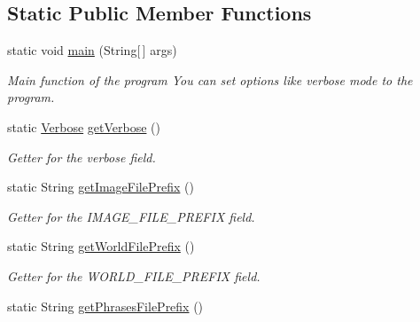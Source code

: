 \subsection*{Static Public Member Functions}
\begin{DoxyCompactItemize}
\item 
static void \hyperlink{a00017_adeef1622cd186b7c8305bb00f9388d43}{main} (String\mbox{[}$\,$\mbox{]} args)
\begin{DoxyCompactList}\small\item\em Main function of the program You can set options like verbose mode to the program. \end{DoxyCompactList}\item 
static \hyperlink{a00035}{Verbose} \hyperlink{a00017_aa9bbd49d874f4dfdf5358bbdad6d8c99}{get\-Verbose} ()
\begin{DoxyCompactList}\small\item\em Getter for the verbose field. \end{DoxyCompactList}\item 
static String \hyperlink{a00017_af77ca65c091ecf625186103af2eac126}{get\-Image\-File\-Prefix} ()
\begin{DoxyCompactList}\small\item\em Getter for the I\-M\-A\-G\-E\-\_\-\-F\-I\-L\-E\-\_\-\-P\-R\-E\-F\-I\-X field. \end{DoxyCompactList}\item 
static String \hyperlink{a00017_ac710346031adfebc390d69138c918b8e}{get\-World\-File\-Prefix} ()
\begin{DoxyCompactList}\small\item\em Getter for the W\-O\-R\-L\-D\-\_\-\-F\-I\-L\-E\-\_\-\-P\-R\-E\-F\-I\-X field. \end{DoxyCompactList}\item 
static String \hyperlink{a00017_a82dab0d4c111eea30c98cdb288a469c8}{get\-Phrases\-File\-Prefix} ()
\end{DoxyCompactItemize}
